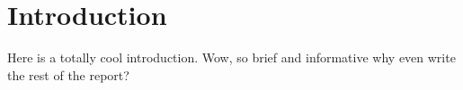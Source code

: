 \section{Introduction}
Here is a totally cool introduction. Wow, so brief and informative why even write the rest of the report?
